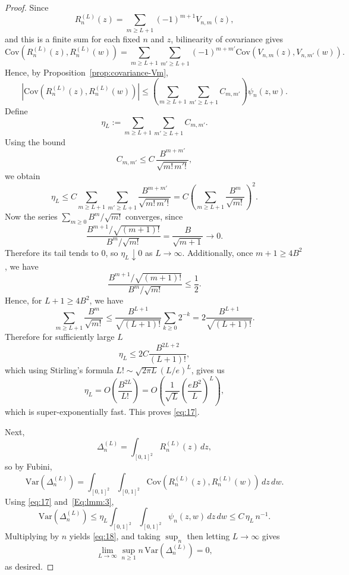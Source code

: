 \documentclass[11pt]{article}
\newcommand{\var}{\mathrm{Var}}
\newcommand{\cov}{\mathrm{Cov}}
\begin{document}
\begin{proof}
Since
\[
R_n^{(L)}(z)=\sum_{m\ge L+1}(-1)^{m+1}V_{n,m}(z),
\]
and this is a finite sum for each fixed $n$ and $z$, bilinearity of covariance gives
\[
\cov\!\left(R_n^{(L)}(z),R_n^{(L)}(w)\right)
=
\sum_{m\ge L+1}\sum_{m'\ge L+1}
(-1)^{m+m'}
\cov\!\left(V_{n,m}(z),V_{n,m'}(w)\right).
\]
Hence, by Proposition~\ref{prop:covariance-Vm},
\[
\left| \cov\!\left(R_n^{(L)}(z),R_n^{(L)}(w)\right) \right|
\le
\left(\sum_{m\ge L+1}\sum_{m'\ge L+1} C_{m,m'}\right)\psi_n(z,w).
\]
Define
\[
\eta_L:=\sum_{m\ge L+1}\sum_{m'\ge L+1} C_{m,m'}.
\]
Using the bound
\[
C_{m,m'} \le C\,\frac{B^{m+m'}}{\sqrt{m!\,m'!}},
\]
we obtain
\[
\eta_L
\le
C\sum_{m\ge L+1}\sum_{m'\ge L+1}
\frac{B^{m+m'}}{\sqrt{m!\,m'!}}
=
C\left(\sum_{m\ge L+1}\frac{B^m}{\sqrt{m!}}\right)^2.
\]
Now the series $\sum_{m\ge 0} B^m/\sqrt{m!}$ converges, since
\[
\frac{B^{m+1}/\sqrt{(m+1)!}}{B^m/\sqrt{m!}}
=
\frac{B}{\sqrt{m+1}}
\rightarrow 0.
\]
Therefore its tail tends to $0$, so $\eta_L \downarrow 0$ as $L\to\infty$. Additionally, once $m + 1\geq 4B^2$, we have
\[
\frac{B^{m+1}/\sqrt{(m+1)!}}{B^m/\sqrt{m!}} \leq \frac{1}{2}.
\]
Hence, for $L + 1 \geq 4B^2$, we have
\[
\sum_{m\geq L + 1}\frac{B^m}{\sqrt{m!}} \leq \frac{B^{L+1}}{\sqrt{(L+1)!}}\sum_{k\geq 0}2^{-k} = 2\frac{B^{L+1}}{\sqrt{(L+1)!}}.
\]
Therefore for sufficiently large $L$
\[
\eta_L \leq 2C \frac{B^{2L+2}}{(L+1)!},
\]
which using Stirling's formula $L!\sim \sqrt{2\pi L}(L/e)^L$, gives us
\[
\eta_L = O\left(\frac{B^{2L}}{L!}\right) = O\left(\frac{1}{\sqrt{L}}\left(\frac{eB^2}{L}\right)^L\right),
\]
which is super-exponentially fast. This proves \eqref{eq:17}.

Next,
\[
\Delta_n^{(L)}=\int_{[0,1]^2} R_n^{(L)}(z)\,dz,
\]
so by Fubini,
\[
\var(\Delta_n^{(L)})
=
\int_{[0,1]^2}\int_{[0,1]^2}
\cov\!\left(R_n^{(L)}(z),R_n^{(L)}(w)\right)\,dz\,dw.
\]
Using \eqref{eq:17} and~\eqref{Eq:lmm:3},
\[
\var(\Delta_n^{(L)})
\le
\eta_L
\int_{[0,1]^2}\int_{[0,1]^2}\psi_n(z,w)\,dz\,dw
\le C\,\eta_L\,n^{-1}.
\]
Multiplying by $n$ yields \eqref{eq:18}, and taking $\sup_n$ then letting $L\to\infty$ gives
\[
\lim_{L\to\infty}\sup_{n\ge 1} n\,\var(\Delta_n^{(L)}) = 0,
\]
as desired.
\end{proof}
\end{document}
